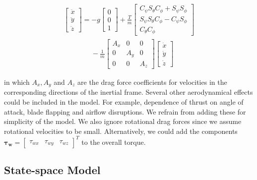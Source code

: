   $$
    \begin{array}{l}
      \left[ \begin{array}{l}{\ddot{x}} \\ {\ddot{y}} \\ {\ddot{z}}\end{array}\right]=-g \left[ \begin{array}{l}{0} \\ {0} \\ {1}\end{array}\right]+\frac{T}{m} \left[ \begin{array}{c}{C_{\psi} S_{\theta} C_{\phi}+S_{\psi} S_{\phi}} \\ {S_{\psi} S_{\theta} C_{\phi}-C_{\psi} S_{\phi}} \\ {C_{\theta} C_{\phi}}\end{array}\right] \\
      \quad \quad \quad \quad  - \frac{1}{m} \left[ \begin{array}{ccc}{A_{x}} & {0} & {0} \\ {0} & {A_{y}} & {0} \\ {0} & {0} & {A_{z}}\end{array}\right] \left[ \begin{array}{c}{\dot{x}} \\ {\dot{y}} \\ {\dot{z}}\end{array}\right]
    \end{array}
  $$

  in which $A_{x}, A_{y}$ and $A_{z}$ are the drag force coefficients for velocities in the corresponding directions of the inertial frame.
  Several other aerodynamical effects could be included in the model. For example,
dependence of thrust on angle of attack, blade flapping and airflow disruptions.
We refrain from adding these for simplicity of the model.
  We also ignore rotational drag forces since we assume rotational velocities to be small. Alternatively,
   we could add the components $\boldsymbol{\tau}_{\boldsymbol{w}}=\left[ \begin{array}{lll}{\tau_{w x}} & {\tau_{w y}} & {\tau_{w z}}\end{array}\right]^{T}$ to the overall torque.

\subsection{State-space Model}
\label{ssec:state_space_model}

